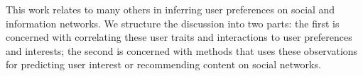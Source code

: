 

This work relates to many others in inferring user preferences on social and information networks. 
We structure the discussion into two parts: 
the first is concerned with correlating these user traits and interactions to user preferences and interests; %
the second is concerned with methods that uses these observations for predicting user interest or recommending content on social networks.


